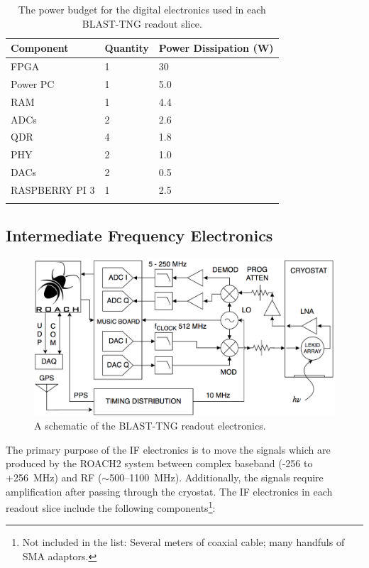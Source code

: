 \begin{table}[!htbp]
\centering
\begin{tabular}{@{}lll@{}}
\dtoprule
Component & Quantity & Power Dissipation (W) \\ \midrule
FPGA & 1 & 30 \\
Power PC & 1 & 5.0 \\
RAM & 1 & 4.4 \\
ADCs & 2 & 2.6 \\
QDR & 4 & 1.8 \\
PHY & 2 & 1.0 \\
DACs & 2 & 0.5 \\
RASPBERRY PI 3 & 1 & 2.5 \\ \dbottomrule
\\
\end{tabular}
\caption[~The power budget for the digital electronics used in each BLAST-TNG readout slice.]{The power budget for the digital electronics used in each BLAST-TNG readout slice.}
\label{tab:dig power budget}
\end{table}

\subsection{Intermediate Frequency Electronics}\label{if electronics}

\begin{figure}
\centering
\includegraphics[width=\textwidth]{figures/readout/schematics/readoutHardwareSchematic}
\caption{A schematic of the BLAST-TNG readout electronics.}
\label{fig:hw schematic}
\end{figure}

The primary purpose of the IF electronics is to move the signals which are produced by the ROACH2 system between complex baseband (-256 to +256~MHz) and RF ($\sim$500--1100~MHz). Additionally, the signals require amplification after passing through the cryostat. The IF electronics in each readout slice include the following components\footnote{Not included in the list: Several meters of coaxial cable; many handfuls of SMA adaptors.}:


